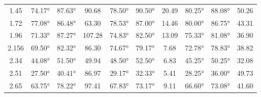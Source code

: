 \begin{table}[H]
\begin{tabular}{|c|c c c|c c c|c c c|}
		\num{1.45}                          & \num{74.17}°                                                                       & \num{87.63}°                                                                        & \num{90.68}                                              & \num{78.50}° & \num{90.50}° & \num{20.49} & \num{80.25}° & \num{88.08}° & \num{50.26} \\
		\num{1.72}                          & \num{77.08}°                                                                       & \num{86.48}°                                                                        & \num{63.30}                                              & \num{78.53}° & \num{87.00}° & \num{14.46} & \num{80.00}° & \num{86.75}° & \num{43.31} \\
		\num{1.96}                          & \num{71.33}°                                                                       & \num{87.27}°                                                                        & \num{107.28}                                             & \num{74.83}° & \num{82.50}° & \num{13.09} & \num{75.33}° & \num{81.08}° & \num{36.90} \\
		\num{2.156}                         & \num{69.50}°                                                                       & \num{82.32}°                                                                        & \num{86.30}                                              & \num{74.67}° & \num{79.17}° & \num{7.68}  & \num{72.78}° & \num{78.83}° & \num{38.82} \\
		\num{2.34}                          & \num{44.08}°                                                                       & \num{51.50}°                                                                        & \num{49.94}                                              & \num{48.50}° & \num{52.50}° & \num{6.83}  & \num{45.25}° & \num{50.25}° & \num{32.08} \\
		\num{2.51}                          & \num{27.50}°                                                                       & \num{40.41}°                                                                        & \num{86.97}                                              & \num{29.17}° & \num{32.33}° & \num{5.41}  & \num{28.25}° & \num{36.00}° & \num{49.73} \\
		\num{2.65}                          & \num{63.75}°                                                                       & \num{78.22}°                                                                        & \num{97.41}                                              & \num{67.83}° & \num{73.17}° & \num{9.11}  & \num{66.60}° & \num{73.08}° & \num{41.60} \\
		\bottomrule
	\end{tabular}
	\label{tab:data}
\end{table}

